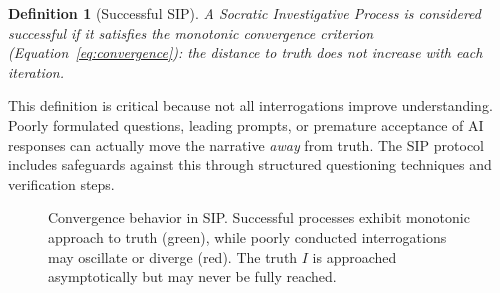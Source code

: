 \documentclass[11pt,a4paper]{article}
\newtheorem{definition}{Definition}[section]
\begin{document}
\begin{definition}[Successful SIP]
A Socratic Investigative Process is considered successful if it satisfies the monotonic convergence criterion (Equation~\ref{eq:convergence}): the distance to truth does not increase with each iteration.
\end{definition}


This definition is critical because not all interrogations improve understanding. Poorly formulated questions, leading prompts, or premature acceptance of AI responses can actually move the narrative \textit{away} from truth. The SIP protocol includes safeguards against this through structured questioning techniques and verification steps.

\begin{figure}[ht]
\centering
{}
\caption{Convergence behavior in SIP. Successful processes exhibit monotonic approach to truth (green), while poorly conducted interrogations may oscillate or diverge (red). The truth $I$ is approached asymptotically but may never be fully reached.}
\label{fig:convergence}
\end{figure}
\end{document}
